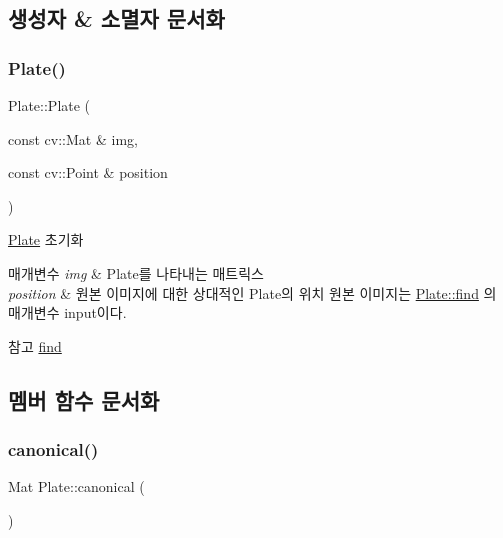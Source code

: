 \subsection{생성자 \& 소멸자 문서화}
\mbox{\label{class_plate_a90e24aeb2c5f3120d3958999b5c673a7}} 
\subsubsection{\texorpdfstring{Plate()}{Plate()}}
{\footnotesize\ttfamily Plate\+::\+Plate (\begin{DoxyParamCaption}\item[{const cv\+::\+Mat \&}]{img,  }\item[{const cv\+::\+Point \&}]{position }\end{DoxyParamCaption})}



\hyperlink{class_plate}{Plate} 초기화 


\begin{DoxyParams}{매개변수}
{\em img} & Plate를 나타내는 매트릭스 \\
\hline
{\em position} & 원본 이미지에 대한 상대적인 Plate의 위치 원본 이미지는 \hyperlink{class_plate_a23487b8b0975634238eb338d994c9694}{Plate\+::find} 의 매개변수 input이다. \\
\hline
\end{DoxyParams}
\begin{DoxySeeAlso}{참고}
\hyperlink{class_plate_a23487b8b0975634238eb338d994c9694}{find} 
\end{DoxySeeAlso}


\subsection{멤버 함수 문서화}
\mbox{\label{class_plate_a950683b0823941cc49dd1289ea1fa259}} 
\subsubsection{\texorpdfstring{canonical()}{canonical()}}
{\footnotesize\ttfamily Mat Plate\+::canonical (\begin{DoxyParamCaption}{ }\end{DoxyParamCaption})}



